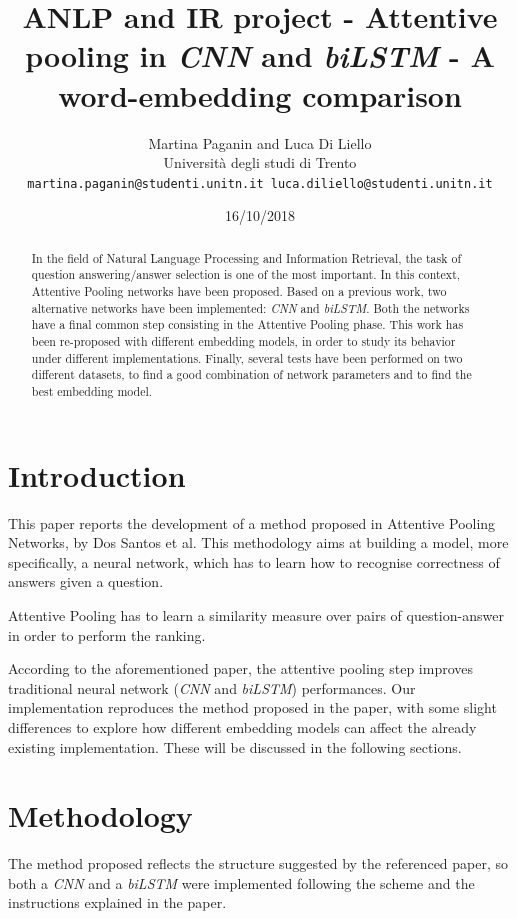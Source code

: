 \documentclass[11pt,a4paper]{article}
\title{ANLP and IR project - Attentive pooling in \textit{CNN} and \textit{biLSTM} - A word-embedding comparison}
\author{Martina Paganin and Luca Di Liello \\
  Universit\`a degli studi di Trento \\
  {\tt martina.paganin@studenti.unitn.it
       luca.diliello@studenti.unitn.it} \\
}
\date{16/10/2018}
\begin{document}
\maketitle
\begin{abstract}
In the field of Natural Language Processing and Information Retrieval, the task of question answering/answer selection is one of the most important.
In this context, Attentive Pooling networks have been proposed. Based on a previous work, two alternative networks have been implemented: \textit{CNN} and \textit{biLSTM}. Both the networks have a final common step consisting in the Attentive Pooling phase.
This work has been re-proposed with different embedding models, in order to study its behavior under different implementations.
Finally, several tests have been performed on two different datasets, to find a good combination of network parameters and to find the best embedding model.

\end{abstract}

\section{Introduction}

This paper reports the development of a method proposed in Attentive Pooling Networks, by Dos Santos et al\cite{mainpaper}. This methodology aims at building a model, more specifically, a neural network, which has to learn how to recognise correctness of answers given a question.

Attentive Pooling has to learn a similarity measure over pairs of question-answer in order to perform the ranking. 

According to the aforementioned paper, the attentive pooling step improves traditional neural network (\textit{CNN} and \textit{biLSTM}) performances. 
Our implementation reproduces the method proposed in the paper, with some slight differences to explore how different embedding models can affect the already existing implementation. These will be discussed in the following sections.

\section{Methodology}
The method proposed reflects the structure suggested by the referenced paper, so both a \textit{CNN} and a \textit{biLSTM} were implemented following the scheme and the instructions explained in the paper.
\end{document}
